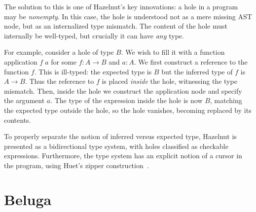 The solution to this is one of Hazelnut's key innovations:
a hole in a program may be \emph{nonempty}.
In this case, the hole is understood not as a mere missing AST node, but as an
internalized type mismatch.
The content of the hole must internally be well-typed, but crucially it can have
\emph{any} type.

For example, consider a hole of type $B$. We wish to fill it with a function
application $f\;a$ for some $f : A \to B$ and $a : A$.
We first construct a reference to the function $f$.
This is ill-typed: the expected type is $B$ but the inferred type of $f$ is $A
\to B$.
Thus the reference to $f$ is placed \emph{inside} the hole, witnessing the type
mismatch.
Then, inside the hole we construct the application node and specify the argument
$a$.
The type of the expression inside the hole is now $B$, matching the expected
type outside the hole, so the hole vanishes, becoming replaced by its contents.

To properly separate the notion of inferred versus expected type, Hazelnut is
presented as a bidirectional type system, with holes classified as checkable
expressions.
Furthermore, the type system has an explicit notion of a cursor in the program,
using Huet's zipper construction~\cite{zipper}.

\section{Beluga}
\label{sec:beluga-intro}

%
